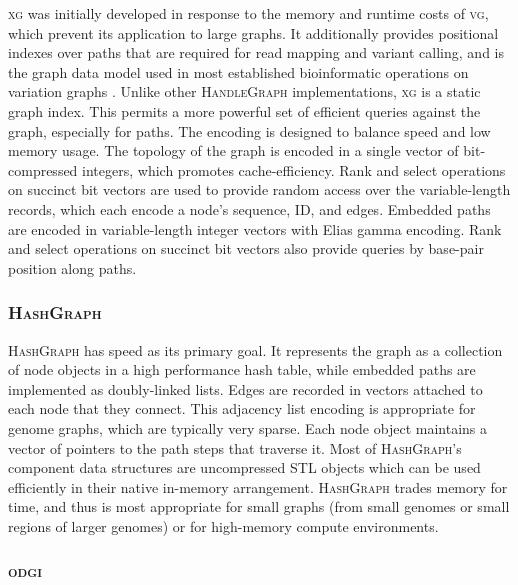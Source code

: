 \documentclass{article}
\begin{document}
\textsc{xg} was initially developed in response to the memory and runtime costs of \textsc{vg}, which prevent its application to large graphs.
It additionally provides positional indexes over paths that are required for read mapping and variant calling, and is the graph data model used in most established bioinformatic operations on variation graphs \cite{Garrison_2018,hickey2020genotyping}.
Unlike other \textsc{HandleGraph} implementations, \textsc{xg} is a static graph index.
This permits a more powerful set of efficient queries against the graph, especially for paths.
The encoding is designed to balance speed and low memory usage.
The topology of the graph is encoded in a single vector of bit-compressed integers, which promotes cache-efficiency.
Rank and select operations on succinct bit vectors are used to provide random access over the variable-length records, which each encode a node's sequence, ID, and edges.
Embedded paths are encoded in variable-length integer vectors with Elias gamma encoding.
Rank and select operations on succinct bit vectors also provide queries by base-pair position along paths.

\subsubsection{\textsc{HashGraph}}

\textsc{HashGraph} has speed as its primary goal.
It represents the graph as a collection of node objects in a high performance hash table, while embedded paths are implemented as doubly-linked lists.
Edges are recorded in vectors attached to each node that they connect.
This adjacency list encoding is appropriate for genome graphs, which are typically very sparse.
Each node object maintains a vector of pointers to the path steps that traverse it.
Most of \textsc{HashGraph}'s component data structures are uncompressed STL objects which can be used efficiently in their native in-memory arrangement.
\textsc{HashGraph} trades memory for time, and thus is most appropriate for small graphs (from small genomes or small regions of larger genomes) or for high-memory compute environments.

\subsubsection{\textsc{odgi}}
\end{document}
